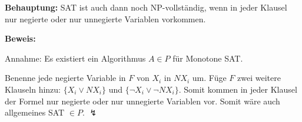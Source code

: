   \noindent
  \textbf{Behauptung: } SAT ist auch dann noch NP-vollständig, wenn in jeder Klausel nur negierte oder nur unnegierte Variablen vorkommen.
  
  \noindent
  \textbf{Beweis: }
  
  Annahme: Es existiert ein Algorithmus $A \in P$ für Monotone SAT.
  
  Benenne jede negierte Variable in $F$ von $X_i$ in $NX_i$ um. Füge $F$ zwei weitere Klauseln hinzu: $\{ X_i \vee NX_i \}$ und $\{ \neg X_i \vee \neg NX_i \}$. Somit kommen in jeder Klausel der Formel nur negierte oder nur unnegierte Variablen vor. Somit wäre auch allgemeines SAT  $\in P$. $\lightning$
  
  
